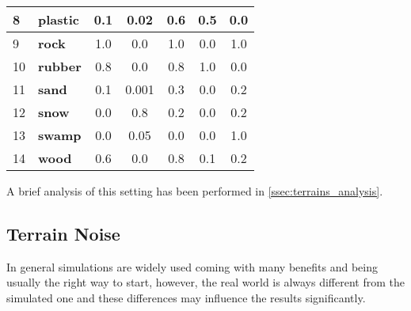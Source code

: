 \begin{table}[H]
\begin{tabular}{|l|l|c|c|c|c|c|}
8                         & \textbf{plastic}       & 0.1                                     & 0.02                                       & 0.6                                    & 0.5                                      & 0.0                                  \\ \hline
9                         & \textbf{rock}          & 1.0                                     & 0.0                                        & 1.0                                    & 0.0                                      & 1.0                                  \\ \hline
10	 					  & \textbf{rubber}        & 0.8                                     & 0.0                                        & 0.8                                    & 1.0                                      & 0.0                                  \\ \hline
11                        & \textbf{sand}          & 0.1                                     & 0.001                                      & 0.3                                    & 0.0                                      & 0.2                                  \\ \hline
12                        & \textbf{snow}          & 0.0                                     & 0.8                                        & 0.2                                    & 0.0                                      & 0.2                                  \\ \hline
13                        & \textbf{swamp}         & 0.0                                     & 0.05                                       & 0.0                                    & 0.0                                      & 1.0                                  \\ \hline
14                        & \textbf{wood}          & 0.6                                     & 0.0                                        & 0.8                                    & 0.1                                      & 0.2                                  \\ \hline
\end{tabular}
\end{table}

A brief analysis of this setting has been performed in \cref{ssec:terrains_analysis}.

\subsection{Terrain Noise} \label{ssec:terrain_noise}
In general simulations are widely used coming with many benefits and being usually the right way to start, however, the real world is always different from the simulated one and these differences may influence the results significantly.

